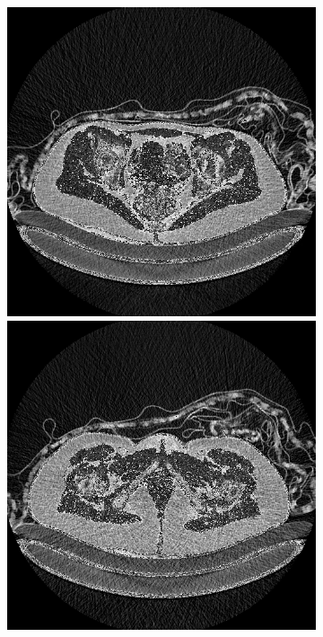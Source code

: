 \begin{figure}[H]
\begin{minipage}{0.3\textwidth}
\begin{subfigure}{\textwidth}
\centering
\includegraphics[width=\textwidth]{Pictures/nnUnet/Praxis/Task109-CT/samples/orig/orig_CT_003_0000-430.png}
\includegraphics[width=\textwidth]{Pictures/nnUnet/Praxis/Task109-CT/samples/orig/orig_CT_003_0000-475.png}

\end{subfigure}
\end{minipage}
\end{figure}
